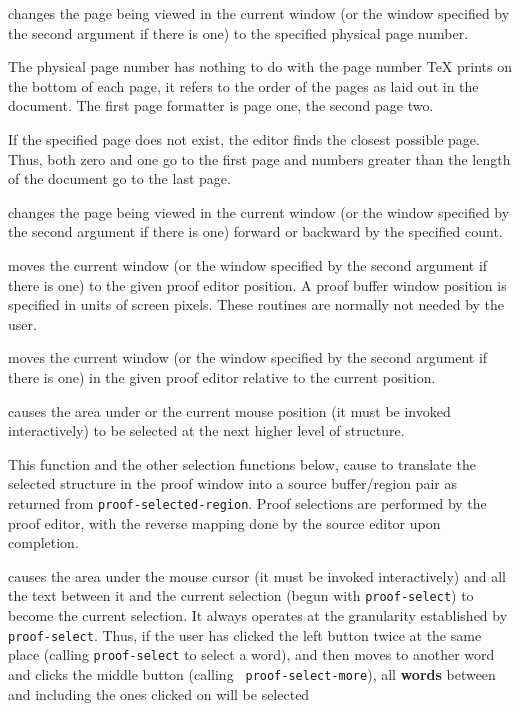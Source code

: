 %
changes the page being viewed in the current window (or the window
specified by the second argument if there is one) to the specified
physical page number.

The physical page number has nothing to do with the page number {\TeX}
prints on the bottom of each page, it refers to the order of the pages
as laid out in the document.  The first page formatter is page one,
the second page two.

If the specified page does not exist, the editor finds the closest
possible page.  Thus, both zero and one go to the first page and
numbers greater than the length of the document go to the last page.

%
changes the page being viewed in the current window (or the window
specified by the second argument if there is one) forward or backward
by the specified count.

%
moves the current window (or the window specified by the second
argument if there is one) to the given proof editor position.
A proof buffer window position is specified in units of screen pixels.
These routines are normally not needed by the user.

%
moves the current window (or the window specified by the second
argument if there is one) in the given proof editor relative to the
current position.

%
causes the area under or the current mouse position (it must be
invoked interactively) to be selected at the next higher level of
structure.

This function and the other selection functions below, cause {\VorTeX}
to trans\-late the selected structure in the proof window into a source
buffer/region pair as returned from {\tt proof-\-sel\-ected-\-region}.
Proof selections are performed by the proof editor, with the reverse
mapping done by the source editor upon completion.

%
causes the area under the mouse cursor (it must be invoked
interactively) and all the text between it and the current selection
(begun with {\tt proof-select}) to become the current selection.  It
always operates at the granularity established by {\tt proof-select}.
Thus, if the user has clicked the left button twice at the same place
(calling {\tt proof-select} to select a word), and then moves to
another word and clicks the middle button (calling {\tt
proof-select-more}), all {\bf words} between and including the ones
clicked on will be selected

